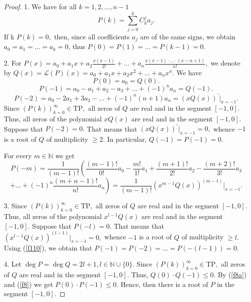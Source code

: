 \documentclass[10pt,a4paper]{amsart}
\numberwithin{count}{section}
\begin{document}
\begin{proof}

1. We have for all $k=1, 2, \ldots, n-1$
\begin{equation}
\label{f7}
P(k) = \sum_{j=0}^k C_k^j  a_j.
\end{equation}
If k $P(k)=0,$ then, since all coefficients $a_j$ are of the same signs, we obtain
$a_0=a_1= \ldots = a_k =0$, thus $P(0) = P(1) = \ldots = P(k-1)=0.$



2. For  $P(x)= a_0 + a_1 x +a_2 \frac{x(x-1)}{2!} 
+  \ldots +a_n \frac{x(x-1)\cdot \ldots \cdot (x-n+1)}{n!},$ 
we denote by  $Q(x) = \mathcal{L}(P) (x) = a_0 +a_1x +a_2 x^2 + \ldots + a_n x^n.$
We have
\begin{equation}
\label{f8a}
P(0) = a_0  = Q(0).
\end{equation}
\begin{equation}
\label{f8}
P(-1) = a_0 - a_1 + a_2 -a_3 + \ldots + (-1)^n a_n = Q(-1).
\end{equation}
\begin{equation}
\label{f9}
P(-2) = a_0 - 2 a_1 + 3a_2 - \ldots + (-1)^n (n+1) a_n = (x Q(x))^\prime|_{x=-1}.
\end{equation}
Since $(P(k))_{k=0}^\infty \in \mathrm{TP},$ all zeros of $Q$ are real and in the segment $[-1, 0].$
Thus, all zeros of the polynomial $xQ(x)$ are real and in the segment $[-1, 0].$ Suppose 
that $P(-2)=0.$  That means that  $(x Q(x))^\prime|_{x=-1} =0,$  whence  $-1$ is a root of $Q$ 
of multiplicity $\geq 2.$ In particular, $Q(-1) = P(-1) =0.$

For every $m\in \mathbb{N}$ we get
$$
P(- m) = \frac{1}{(m-1)!} \left( \frac{(m-1)! }{0!} a_0 - \frac{m!}{1!} a_1 + \frac{(m+1)!}{2!} a_2 -  \frac{(m+2)!}{3! } a_3  \right.$$   
$$\left.   + \ldots + (-1)^n \frac{(m+n-1)!}{n!} a_n\right ) =
\frac{1}{(m-1)!}  \left(x^{m-1} Q(x)\right)^{(m-1)}|_{x=-1}.
$$

3.  Since $(P(k))_{k=0}^\infty \in \mathrm{TP},$ all zeros of $Q$ are real and in the segment $[-1, 0].$
Thus, all zeros of the polynomial $x^{l-1} Q(x)$ are real and in the segment $[-1, 0].$ Suppose 
that $P(- l)=0.$  That means that  $\left(x^{l-1} Q(x)\right)^{(l-1)}|_{x=-1} =0,$  whence  $-1$ 
is a root of $Q$ of multiplicity $\geq l.$ Using (\ref{f110}), we obtain that  
$P(-1) = P(-2) = \ldots = P(-(l-1))=0.$


4. Let  $\deg P = \deg Q = 2l+1, l \in \mathbb{N}\cup \{0\}. $ Since $(P(k))_{k=0}^\infty \in \mathrm{TP},$ 
all zeros of $Q$  are real and in the segment $[-1, 0].$  Thus, $Q(0)\cdot Q(-1) \leq 0.$
By (\ref{f8a}) and (\ref{f8}) we get $P(0)\cdot P(-1) \leq 0.$ Hence, then there is a 
root of $P$ in the segment $[-1, 0].$


\end{proof}
\end{document}
